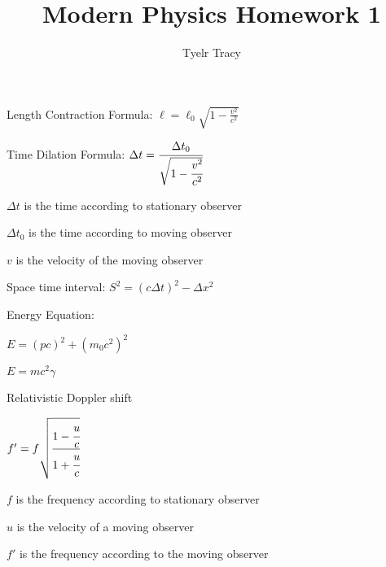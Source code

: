 \documentclass{article}
\title{Modern Physics Homework 1}
\author{Tyelr Tracy}
\begin{document}
Length Contraction Formula: $\ell = \ell_0 \sqrt{1 - \frac{v^2}{c^2}}$

Time Dilation Formula: $\Delta t = \cfrac{\Delta t_0}{\sqrt{1-\cfrac{v^2}{c^2}}}$

\hspace*{10mm} $\Delta t$ is the time according to stationary observer

\hspace*{10mm} $\Delta t_0$ is the time according to moving observer

\hspace*{10mm} $v$ is the velocity of the moving observer




Space time interval: $S^2 =  (c \Delta t)^2 - \Delta x^2 $


Energy Equation:

$E = (pc)^2 + (m_0c^2)^2$

$E = mc^2\gamma$



Relativistic Doppler shift

$f' = f \sqrt{\cfrac{1- \cfrac{u}{c}}{1 + \cfrac{u}{c}}}$

\hspace*{10mm} $f$ is the frequency according to stationary observer

\hspace*{10mm} $u$ is the velocity of a moving observer

\hspace*{10mm} $f'$ is the frequency according to the moving observer
\end{document}
